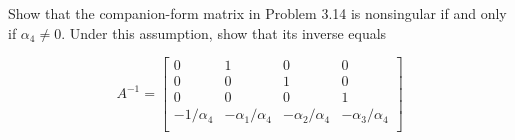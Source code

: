 \item [3.16] Show that the companion-form matrix in Problem 3.14 is nonsingular if and only if $\alpha_4 \neq 0$.
Under this assumption, show that its inverse equals

\begin{equation*}
 A^{-1} = \begin{bmatrix}
           0 & 1 & 0 & 0 \\
           0 & 0 & 1 & 0 \\
           0 & 0 & 0 & 1 \\
           -1/\alpha_4 & -\alpha_1/\alpha_4 & -\alpha_2 /\alpha_4 & -\alpha_3 /\alpha_4 \\
          \end{bmatrix}
\end{equation*}

